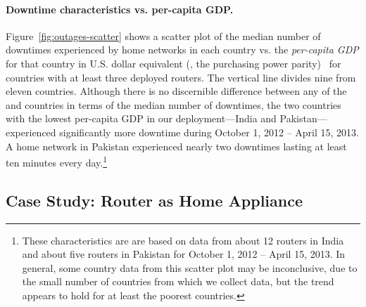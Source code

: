 \paragraph{Downtime characteristics vs. per-capita GDP.}
Figure~\ref{fig:outages-scatter} shows a scatter plot of the median
number of downtimes experienced by home networks in each country vs. the
{\em per-capita GDP} for that country in U.S. dollar equivalent (\ie,
the purchasing power parity)~\cite{www-imf-gdp} for countries with at
least three deployed routers.  The vertical line divides
nine \developing{} from eleven \developed{} countries.  Although
there is no discernible difference between any of the \developing{} and
\developed{} countries in terms of the median number of downtimes, the two
countries with the lowest per-capita GDP in our deployment---India and
Pakistan---experienced significantly more downtime during October 1, 2012 -- April 15,
2013. A home network in Pakistan experienced nearly two downtimes lasting
at least ten minutes every day.\footnote{These characteristics are are
  based on data from about 12 routers in India and about five routers in
  Pakistan for October 1, 2012 -- April 15, 2013.  In general, some country data from
  this scatter plot may be inconclusive, due to the small number of
  countries from which we collect data, but the trend appears to hold
  for at least the poorest countries.}


\subsection{Case Study: Router as Home Appliance}\label{sec:avail-case}

